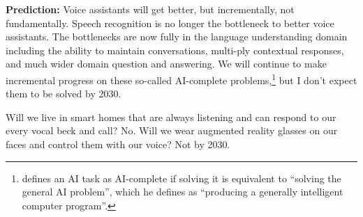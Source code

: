 {\bf Prediction:} Voice assistants will get better, but incrementally, not
fundamentally. Speech recognition is no longer the bottleneck to better voice
assistants. The bottlenecks are now fully in the language understanding domain
including the ability to maintain conversations, multi-ply contextual
responses, and much wider domain question and answering. We will continue to
make incremental progress on these so-called AI-complete
problems,\footnote{\citet[sec. 4]{shapiro1992encyclopedia} defines an AI task as
AI-complete if solving it is equivalent to ``solving the general AI problem'',
which he defines as ``producing a generally intelligent computer program''.}
but I don't expect them to be solved by 2030.

Will we live in smart homes that are always listening and can respond to our
every vocal beck and call? No. Will we wear augmented reality glasses on our
faces and control them with our voice? Not by 2030.

